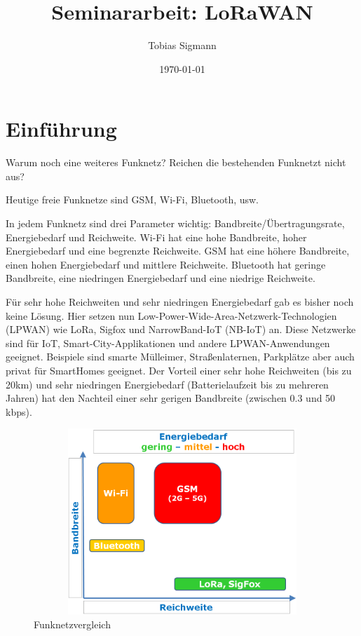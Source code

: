 \documentclass[a4paper, 12pt]{article}
\author{Tobias Sigmann}
\title{Seminararbeit: LoRaWAN}
\date{\today}
\begin{document}
    \maketitle
    \newpage
    \tableofcontents
    \newpage

    \section{Einführung}
        Warum noch eine weiteres Funknetz? 
        Reichen die bestehenden Funknetzt nicht aus?

        Heutige freie Funknetze sind GSM, Wi-Fi, Bluetooth, usw.
        
        In jedem Funknetz sind drei Parameter wichtig: Bandbreite/Übertragungsrate, Energiebedarf und Reichweite.
        Wi-Fi hat eine hohe Bandbreite, hoher Energiebedarf und eine begrenzte Reichweite. 
        GSM hat eine höhere Bandbreite, einen hohen Energiebedarf und mittlere Reichweite.
        Bluetooth hat geringe Bandbreite, eine niedringen Energiebedarf und eine niedrige Reichweite.
        
        Für sehr hohe Reichweiten und sehr niedringen Energiebedarf gab es bisher noch keine Lösung.
        Hier setzen nun Low-­Power-Wide-Area-Netzwerk-Technologien
        (LPWAN) wie LoRa, Sigfox und NarrowBand-IoT (NB-IoT) an. Diese Netzwerke sind für IoT,
        Smart-City-Applikationen und andere LPWAN-Anwendungen geeignet.
        Beispiele sind smarte Mülleimer, Straßenlaternen, Parkplätze aber auch privat für SmartHomes geeignet.
        Der Vorteil einer sehr hohe Reichweiten (bis zu 20km) und sehr niedringen Energiebedarf (Batterielaufzeit
        bis zu mehreren Jahren) hat den Nachteil einer sehr gerigen Bandbreite (zwischen 0.3 und 50 kbps). 


        \begin{figure}[h]
            \centering
            \includegraphics[width=13cm, height=7cm]{Einfuehrung}
            \caption{Funknetzvergleich}
        \end{figure}
\end{document}
